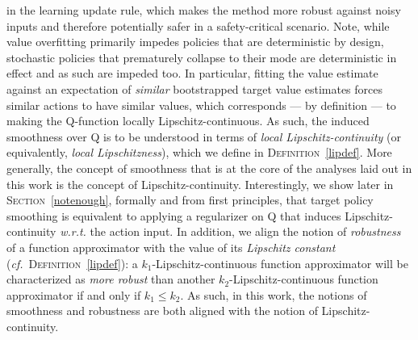 in the learning update rule, which makes the method more robust against noisy inputs
and therefore potentially safer in a safety-critical scenario.
Note, while value overfitting primarily impedes policies that are deterministic by design,
stochastic policies that prematurely collapse to their mode \cite{Schulman2015-jt}
are deterministic in effect and as such are impeded too.
In particular, fitting the value estimate against an expectation
of \emph{similar} bootstrapped target value estimates forces similar actions
to have similar values, which corresponds --- by definition ---
to making the Q-function locally Lipschitz-continuous.
As such, the induced smoothness over Q is to be understood
in terms of \emph{local Lipschitz-continuity}
(or equivalently, \emph{local Lipschitzness}), which we define in \textsc{Definition}~\ref{lipdef}.
More generally, the concept of smoothness that is at the core of the analyses
laid out in this work is the concept of Lipschitz-continuity.
Interestingly, we show later in \textsc{Section}~\ref{notenough},
formally and from first principles,
that target policy smoothing is equivalent to applying a regularizer on Q that induces
Lipschitz-continuity \textit{w.r.t.} the action input.
In addition, we align the notion of \emph{robustness} of a function approximator
with the value of its \emph{Lipschitz constant} (\textit{cf.}~\textsc{Definition}~\ref{lipdef}): a
$k_1$-Lipschitz-continuous
function approximator will be characterized as
\emph{more robust} than another $k_2$-Lipschitz-continuous function approximator if and only if $k_1 \leq k_2$.
As such, in this work, the notions of smoothness and robustness are both aligned with the notion of
Lipschitz-continuity.

